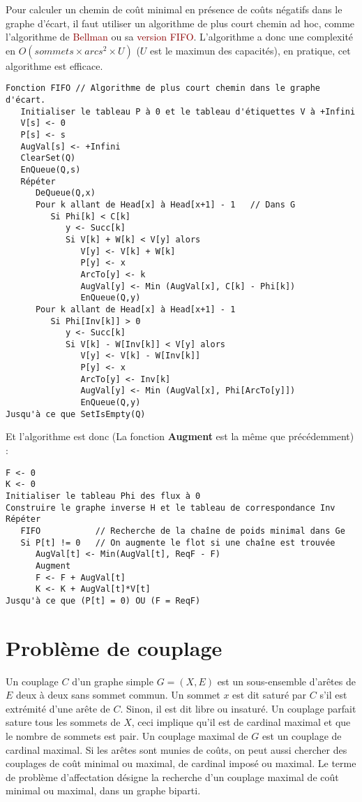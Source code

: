 \documentclass{article}
\newcommand{\red}[1]{\textcolor{darkred}{#1}}
\begin{document}
Pour calculer un chemin de coût minimal en présence de coûts négatifs dans le graphe d’écart, il faut utiliser un algorithme de plus court chemin ad hoc, comme l’algorithme de
\red{Bellman} ou sa \red{version FIFO}. L’algorithme a donc une complexité en $O(sommets \times arcs^2 \times U)$ ($U$ est le maximun des capacités), en pratique, cet 
algorithme est efficace.

\begin{verbatim}
Fonction FIFO // Algorithme de plus court chemin dans le graphe d'écart.
   Initialiser le tableau P à 0 et le tableau d'étiquettes V à +Infini
   V[s] <- 0
   P[s] <- s
   AugVal[s] <- +Infini
   ClearSet(Q)
   EnQueue(Q,s)
   Répéter
      DeQueue(Q,x)
      Pour k allant de Head[x] à Head[x+1] - 1   // Dans G
         Si Phi[k] < C[k]
            y <- Succ[k]
            Si V[k] + W[k] < V[y] alors
               V[y] <- V[k] + W[k]
               P[y] <- x
               ArcTo[y] <- k
               AugVal[y] <- Min (AugVal[x], C[k] - Phi[k])
               EnQueue(Q,y)
      Pour k allant de Head[x] à Head[x+1] - 1
         Si Phi[Inv[k]] > 0
            y <- Succ[k]
            Si V[k] - W[Inv[k]] < V[y] alors
               V[y] <- V[k] - W[Inv[k]]
               P[y] <- x
               ArcTo[y] <- Inv[k]
               AugVal[y] <- Min (AugVal[x], Phi[ArcTo[y]])
               EnQueue(Q,y)
Jusqu'à ce que SetIsEmpty(Q)
\end{verbatim}

\noindent Et l'algorithme est donc (La fonction \textbf{Augment} est la même que précédemment) :
\begin{verbatim}
F <- 0
K <- 0
Initialiser le tableau Phi des flux à 0
Construire le graphe inverse H et le tableau de correspondance Inv
Répéter
   FIFO           // Recherche de la chaîne de poids minimal dans Ge
   Si P[t] != 0   // On augmente le flot si une chaîne est trouvée
      AugVal[t] <- Min(AugVal[t], ReqF - F)
      Augment
      F <- F + AugVal[t]
      K <- K + AugVal[t]*V[t]
Jusqu'à ce que (P[t] = 0) OU (F = ReqF)
\end{verbatim}

\section{Problème de couplage}

Un couplage $C$ d’un graphe simple $G=(X,E)$ est un sous-ensemble d’arêtes de $E$ deux à deux sans sommet commun. Un sommet $x$ est dit saturé par $C$ s’il est extrémité 
d’une arête de $C$. Sinon, il est dit libre ou insaturé. Un couplage parfait sature tous les sommets de $X$, ceci implique qu’il est de cardinal maximal et que le nombre de sommets 
est pair. Un couplage maximal de $G$ est un couplage de cardinal maximal. Si les arêtes sont munies de coûts, on peut aussi chercher des couplages de coût minimal ou maximal, de
cardinal imposé ou maximal. Le terme de problème d’affectation désigne la recherche d’un couplage maximal de coût minimal ou maximal, dans un graphe biparti.
\end{document}
